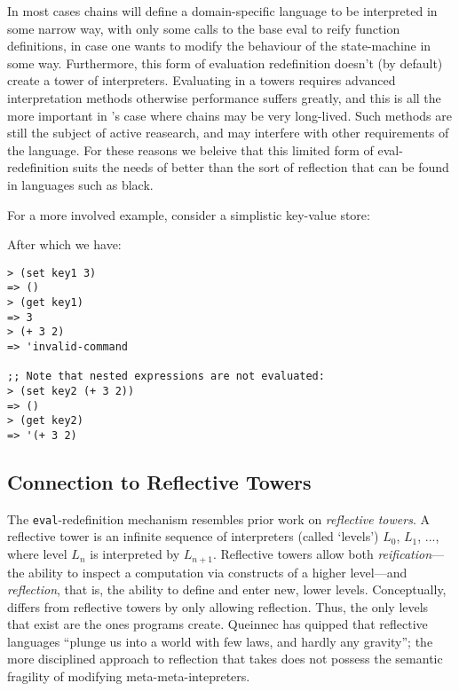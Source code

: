 In most cases chains will define a domain-specific language to be interpreted in
some narrow way, with only some calls to the base eval to reify function
definitions, in case one wants to modify the behaviour of the state-machine in
some way. Furthermore, this form of evaluation redefinition doesn't (by default)
create a tower of interpreters. Evaluating in a towers requires advanced
interpretation methods otherwise performance suffers greatly, and this is all
the more important in \rad's case where chains may be very long-lived. Such
methods are still the subject of active reasearch, and may interfere with other
requirements of the language. For these reasons we beleive that this limited
form of eval-redefinition suits the needs of \rad better than the sort of
reflection that can be found in languages such as black.




For a more involved example, consider a simplistic key-value store:



After which we have:

\begin{verbatim}
> (set key1 3)
=> ()
> (get key1)
=> 3
> (+ 3 2)
=> 'invalid-command

;; Note that nested expressions are not evaluated:
> (set key2 (+ 3 2))
=> ()
> (get key2)
=> '(+ 3 2)
\end{verbatim}

\subsection{Connection to Reflective Towers}
\label{s:reflective-towers}

The \texttt{eval}-redefinition mechanism resembles prior work on
\emph{reflective towers}. A reflective tower is an infinite sequence of
interpreters (called `levels') $L_0$, $L_1$, ..., where level $L_n$ is
interpreted by $L_{n+1}$. Reflective towers allow both \emph{reification}---the
ability to inspect a computation via constructs of a higher level---and
\emph{reflection}, that is, the ability to define and enter new, lower levels.
Conceptually, \rad differs from reflective towers by only allowing reflection.
Thus, the only levels that exist are the ones programs create. Queinnec has
quipped that reflective languages ``plunge us into a world with few laws, and
hardly any gravity''\cite{Queinnec1994}; the more disciplined approach to
reflection that \rad takes does not possess the semantic fragility of modifying
meta-meta-intepreters.

